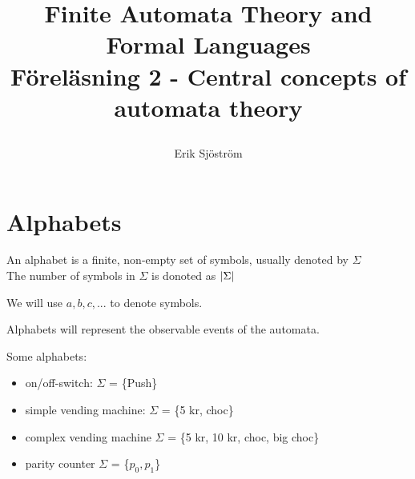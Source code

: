 
\usepackage{color}
\title{
	 Finite Automata Theory and Formal Languages\\
	 Föreläsning 2 - Central concepts of automata theory
    \author{Erik Sjöström}
}

\maketitle

\section{Alphabets} %
\label{sec:alphabets}
\begin{Def}
    An alphabet is a finite, non-empty set of symbols, usually denoted by $\Sigma$\\
    The number of symbols in $\Sigma$ is donoted as $\lvert\Sigma\rvert$
\end{Def}

\begin{Not}
We will use $a,b,c,...$ to denote symbols.
\end{Not}

\begin{Rem}
Alphabets will represent the observable events of the automata.
\end{Rem}
\begin{Ex}
    Some alphabets:
    \begin{itemize}
        \item on/off-switch: $\Sigma$ = \{Push\}
        \item simple vending machine: $\Sigma$ = \{5 kr, choc\}
        \item complex vending machine $\Sigma$ = \{5 kr, 10 kr, choc, big choc\}
        \item parity counter $\Sigma$ = \{$p_0, p_1$\}
    \end{itemize}
\end{Ex}


